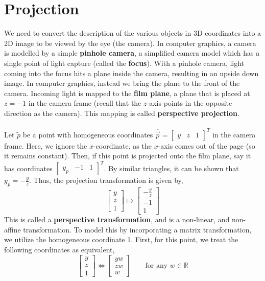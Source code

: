 \documentclass[letterpaper,12pt]{article}
\begin{document}
\section*{Projection}
We need to convert the description of the various objects in 3D coordinates into a 2D image to be viewed by the eye (the camera). In computer graphics, a camera is modelled by a simple \textbf{pinhole camera}, a simplified camera model which has a single point of light capture (called the \textbf{focus}). With a pinhole camera, light coming into the focus hits a plane inside the camera, resulting in an upside down image. In computer graphics, instead we bring the plane to the front of the camera. Incoming light is mapped to the \textbf{film plane}, a plane that is placed at $z = -1$ in the camera frame (recall that the $z$-axis points in the opposite direction as the camera). This mapping is called \textbf{perspective projection}.
\\ \\ Let $\tilde{p}$ be a point with homogeneous coordinates $\overline{\vec{p}} = \begin{bmatrix} y & z & 1 \end{bmatrix}^T$ in the camera frame. Here, we ignore the $x$-coordinate, as the $x$-axis comes out of the page (so it remains constant). Then, if this point is projected onto the film plane, say it has coordinates $\begin{bmatrix} y_p & -1 & 1 \end{bmatrix}^T$. By similar triangles, it can be shown that $y_p = -\frac{y}{z}$. Thus, the projection transformation is given by,
\begin{equation*}
    \begin{bmatrix} y \\ z \\ 1 \end{bmatrix} \longmapsto \begin{bmatrix} -\frac{y}{z} \\ -1 \\ 1 \end{bmatrix}
\end{equation*}
This is called a \textbf{perspective transformation}, and is a non-linear, and non-affine transformation. To model this by incorporating a matrix transformation, we utilize the homogeneous coordinate 1. First, for this point, we treat the following coordinates as equivalent,
\begin{equation*}
    \begin{bmatrix} y \\ z \\ 1 \end{bmatrix} \Longleftrightarrow \begin{bmatrix} yw \\ zw \\ w \end{bmatrix} \qquad \text{for any $w \in \mathbb{R}$}
\end{equation*}
\end{document}
